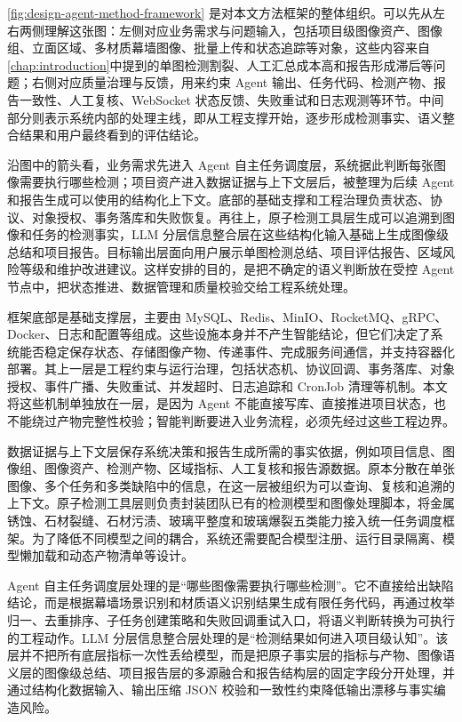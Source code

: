 \cref{fig:design-agent-method-framework} 是对本文方法框架的整体组织。可以先从左右两侧理解这张图：左侧对应业务需求与问题输入，包括项目级图像资产、图像组、立面区域、多材质幕墙图像、批量上传和状态追踪等对象，这些内容来自\cref{chap:introduction}中提到的单图检测割裂、人工汇总成本高和报告形成滞后等问题；右侧对应质量治理与反馈，用来约束 Agent 输出、任务代码、检测产物、报告一致性、人工复核、WebSocket 状态反馈、失败重试和日志观测等环节。中间部分则表示系统内部的处理主线，即从工程支撑开始，逐步形成检测事实、语义整合结果和用户最终看到的评估结论。

沿图中的箭头看，业务需求先进入 Agent 自主任务调度层，系统据此判断每张图像需要执行哪些检测；项目资产进入数据证据与上下文层后，被整理为后续 Agent 和报告生成可以使用的结构化上下文。底部的基础支撑和工程治理负责状态、协议、对象授权、事务落库和失败恢复。再往上，原子检测工具层生成可以追溯到图像和任务的检测事实，LLM 分层信息整合层在这些结构化输入基础上生成图像级总结和项目报告。目标输出层面向用户展示单图检测总结、项目评估报告、区域风险等级和维护改进建议。这样安排的目的，是把不确定的语义判断放在受控 Agent 节点中，把状态推进、数据管理和质量校验交给工程系统处理。

框架底部是基础支撑层，主要由 MySQL、Redis、MinIO、RocketMQ、gRPC、Docker、日志和配置等组成。这些设施本身并不产生智能结论，但它们决定了系统能否稳定保存状态、存储图像产物、传递事件、完成服务间通信，并支持容器化部署。其上一层是工程约束与运行治理，包括状态机、协议回调、事务落库、对象授权、事件广播、失败重试、并发超时、日志追踪和 CronJob 清理等机制。本文将这些机制单独放在一层，是因为 Agent 不能直接写库、直接推进项目状态，也不能绕过产物完整性校验；智能判断要进入业务流程，必须先经过这些工程边界。

数据证据与上下文层保存系统决策和报告生成所需的事实依据，例如项目信息、图像组、图像资产、检测产物、区域指标、人工复核和报告源数据。原本分散在单张图像、多个任务和多类缺陷中的信息，在这一层被组织为可以查询、复核和追溯的上下文。原子检测工具层则负责封装团队已有的检测模型和图像处理脚本，将金属锈蚀、石材裂缝、石材污渍、玻璃平整度和玻璃爆裂五类能力接入统一任务调度框架。为了降低不同模型之间的耦合，系统还需要配合模型注册、运行目录隔离、模型懒加载和动态产物清单等设计。

Agent 自主任务调度层处理的是“哪些图像需要执行哪些检测”。它不直接给出缺陷结论，而是根据幕墙场景识别和材质语义识别结果生成有限任务代码，再通过枚举归一、去重排序、子任务创建策略和失败回调重试入口，将语义判断转换为可执行的工程动作。LLM 分层信息整合层处理的是“检测结果如何进入项目级认知”。该层并不把所有底层指标一次性丢给模型，而是把原子事实层的指标与产物、图像语义层的图像级总结、项目报告层的多源融合和报告结构层的固定字段分开处理，并通过结构化数据输入、输出压缩 JSON 校验和一致性约束降低输出漂移与事实编造风险。

